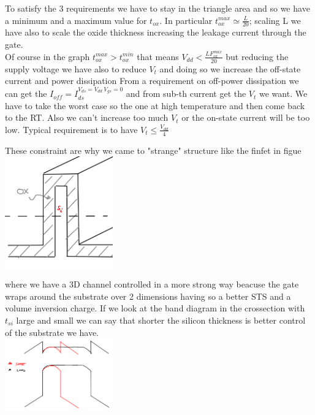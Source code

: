 To satisfy the 3 requirements we have to stay in the triangle area and so we have a minimum and a maximum value for $t_{ox}$. In particular $t_{ox}^{max}\simeq \frac{L}{20}$; scaling L we have also to scale the oxide thickness increasing the leakage current through the gate.\\
Of course in the graph $t_{ox}^{max}>t_{ox}^{min}$ that means $V_{dd}<\frac{LF_{ox}^{max}}{20}$ but reducing the supply voltage we have also to reduce $V_t$ and doing so we increase the off-state current and power dissipation
From a requirement on off-power dissipation we can get the $I_{off}=I_{ds}^{V_{ds}=V_{dd} \ V_{gs}=0}$ and from sub-th current get the $V_t$ we want. We have to take the worst case so the one at high temperature and then come back to the RT. Also we can't increase too much $V_t$ or the on-state current will be too low. Typical requirement is to have $V_t \le \frac{V_{dd}}{4}$\\

\vspace{5mm}

These constraint are why we came to "strange" structure like the finfet in figue \\

\centering
\includegraphics[width=0.35\textwidth]{finfet.png}\\
\raggedright

where we have a 3D channel controlled in a more strong way beacuse the gate wraps around the substrate over 2 dimensions having so a better STS and a volume inversion charge.
If we look at the band diagram in the crossection with $t_{si}$ large and small we can say that shorter the silicon thickness is better control of the substrate we have.\\

\centering
\includegraphics[width=0.35\textwidth]{finfetbd.png}\\
\raggedright

